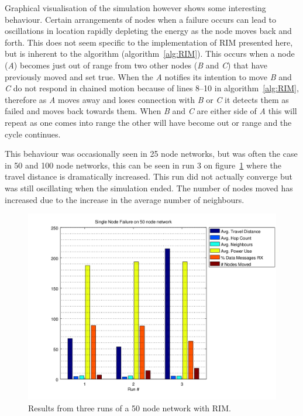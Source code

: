 \documentclass[authoryearcitations]{UoYCSproject}
\begin{document}
Graphical visualisation of the simulation however shows some interesting behaviour. Certain arrangements of nodes when a failure occurs can lead to oscillations in location rapidly depleting the energy as the node moves back and forth. This does not seem specific to the implementation of RIM presented here, but is inherent to the algorithm (algorithm~\ref{alg:RIM}). This occurs when a node (\emph{A}) becomes just out of range from two other nodes (\emph{B} and \emph{C}) that have previously moved and set  true. When the \emph{A} notifies its intention to move \emph{B} and \emph{C} do not respond in chained motion because of lines 8--10 in algorithm~\ref{alg:RIM}, therefore as \emph{A} moves away and loses connection with \emph{B} or \emph{C} it detects them as failed and moves back towards them. When \emph{B} and \emph{C} are either side of \emph{A} this will repeat as one comes into range the other will have become out or range and the cycle continues.

This behaviour was occasionally seen in 25 node networks, but was often the case in 50 and 100 node networks, this can be seen in run 3 on figure~\ref{fig:singlefail_50node} where the travel distance is dramatically increased. This run did not actually converge but was still oscillating when the simulation ended. The number of nodes moved has increased due to the increase in the average number of neighbours.

\begin{figure}
 \centering
    \includegraphics[width=\textwidth]{figures/singlefail_50node.png}
    \caption{Results from three runs of a 50 node network with RIM.}
    \label{fig:singlefail_50node}
\end{figure}
\end{document}
